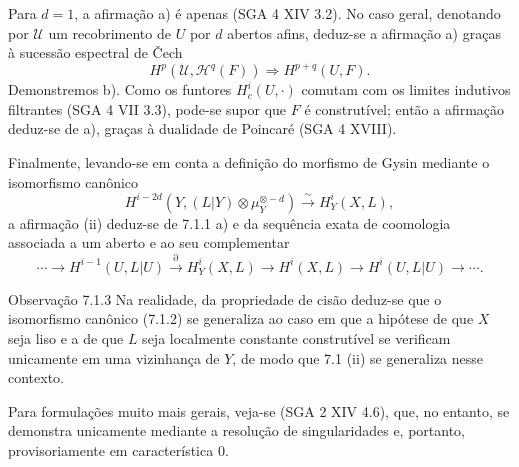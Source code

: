 Para $d=1$, a afirmação a) é apenas (SGA 4 XIV 3.2). No caso geral, denotando por $\mathcal U$ um recobrimento de $U$ por $d$ abertos afins, deduz-se a afirmação a) graças à sucessão espectral de Čech
\[
H^p(\mathcal U,\mathcal H^q(F))\Rightarrow H^{p+q}(U,F).
\]
Demonstremos b). Como os funtores $H_c^i(U,\cdot)$ comutam com os limites indutivos filtrantes (SGA 4 VII 3.3), pode-se supor que $F$ é construtível; então a afirmação deduz-se de a), graças à dualidade de Poincaré (SGA 4 XVIII).

Finalmente, levando-se em conta a definição do morfismo de Gysin mediante o isomorfismo canônico
\[
H^{i-2d}(Y,(L|Y)\otimes\mu_Y^{\otimes -d})\xrightarrow{\sim} H^i_Y(X,L),
\tag{7.1.2}
\]
a afirmação (ii) deduz-se de 7.1.1 a) e da sequência exata de coomologia associada a um aberto e ao seu complementar
\[
\cdots\to H^{i-1}(U,L|U)\xrightarrow{\partial}H^i_Y(X,L)\to H^i(X,L)\to H^i(U,L|U)\to\cdots .
\]

\begin{statement}{Observação 7.1.3}
Na realidade, da propriedade de cisão deduz-se que o isomorfismo canônico (7.1.2) se generaliza ao caso em que a hipótese de que $X$ seja liso e a de que $L$ seja localmente constante construtível se verificam unicamente em uma vizinhança de $Y$, de modo que 7.1 (ii) se generaliza nesse contexto.

Para formulações muito mais gerais, veja-se (SGA 2 XIV 4.6), que, no entanto, se demonstra unicamente mediante a resolução de singularidades e, portanto, provisoriamente em característica $0$.
\end{statement}
